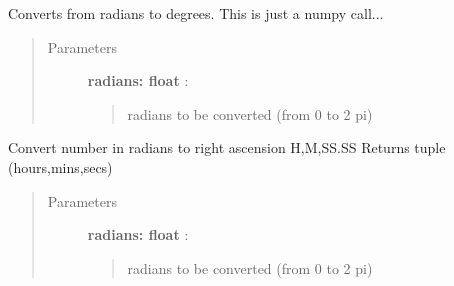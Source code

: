 \documentclass[letterpaper,10pt,english]{sphinxmanual}
\begin{document}

\begin{fulllineitems}
\label{index:astroCoords.rad2deg}
Converts from radians to degrees.
This is just a numpy call...
\begin{quote}\begin{description}
\item[{Parameters }] \leavevmode
\textbf{radians: float} :
\begin{quote}

radians to be converted (from 0 to 2 pi)
\end{quote}

\end{description}\end{quote}

\end{fulllineitems}



\begin{fulllineitems}
\label{index:astroCoords.rad2rahms}
Convert number in radians to right ascension H,M,SS.SS
Returns tuple (hours,mins,secs)
\begin{quote}\begin{description}
\item[{Parameters }] \leavevmode
\textbf{radians: float} :
\begin{quote}

radians to be converted (from 0 to 2 pi)
\end{quote}

\end{description}\end{quote}

\end{fulllineitems}


\end{document}
